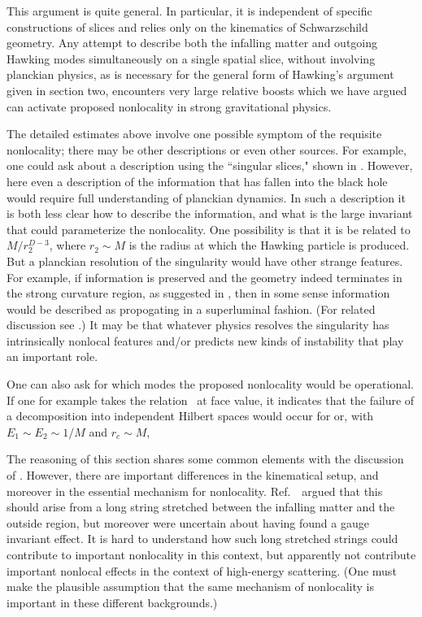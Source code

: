 This argument is quite general.  In particular, it is independent of specific constructions of slices and relies only on the kinematics of Schwarzschild geometry.  Any attempt to describe both the infalling matter and outgoing Hawking modes simultaneously on a single spatial slice, without involving planckian physics, as is necessary for the general form of Hawking's argument given in section two, encounters very large relative boosts which we have argued can activate proposed nonlocality in strong gravitational physics.  

The detailed estimates above involve one possible symptom of the requisite nonlocality; there may be other descriptions or even other sources.  For example, one could ask about a description using the ``singular slices," shown in \singslice. However, here even a  description of the information that has fallen into the black hole would require full understanding of planckian dynamics.  In such a description it is both less clear how to describe the information, and what is the large invariant that could parameterize the nonlocality.   One possibility is that it is  be related to $M/r_2^{D-3}$, where $r_2\sim M$ is the radius at which the Hawking particle is produced.  But a planckian resolution of the singularity would have other strange features.  For example, if information is preserved and the geometry indeed terminates in the strong curvature region, as suggested in \singslice, then in some sense information would be described as propogating in a superluminal fashion.  (For related discussion see \BHMR.)  It may be that whatever physics resolves the singularity has intrinsically nonlocal features and/or predicts new kinds of instability that play an important role.


One can also ask for which modes the proposed nonlocality would be operational.  If one for example takes the relation \locbd\ at face value, it indicates that the failure of a decomposition into independent Hilbert spaces would occur for 
%
\eqn{}
%
or, with $E_1\sim E_2\sim 1/M$ and $r_c\sim M$, 
%
\eqn{}
%

The reasoning of this section shares some common elements with the discussion of \LPSTU.  However, there are important differences in the kinematical setup, and moreover in the essential mechanism for nonlocality.  Ref.~\LPSTU\ argued that this should arise from a long string stretched between the infalling matter and the outside region, but moreover were uncertain about having found a gauge invariant effect\Polchrev.  It is hard to understand how such long stretched strings could contribute to important nonlocality in this context, but apparently not contribute important nonlocal effects in the context of high-energy scattering\SGloc.  (One must make the plausible assumption that the same mechanism of nonlocality is important in these different backgrounds.)

